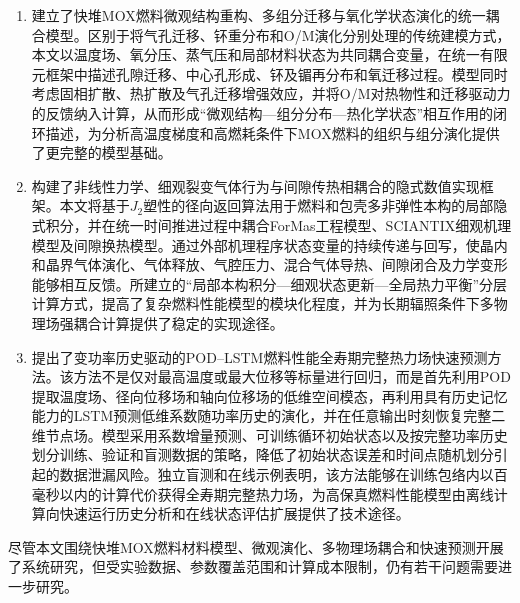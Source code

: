 \begin{enumerate}[label={（\arabic*）},leftmargin=2.8em]
	\item 建立了快堆MOX燃料微观结构重构、多组分迁移与氧化学状态演化的统一耦合模型。区别于将气孔迁移、钚重分布和O/M演化分别处理的传统建模方式，本文以温度场、氧分压、蒸气压和局部材料状态为共同耦合变量，在统一有限元框架中描述孔隙迁移、中心孔形成、钚及镅再分布和氧迁移过程。模型同时考虑固相扩散、热扩散及气孔迁移增强效应，并将O/M对热物性和迁移驱动力的反馈纳入计算，从而形成“微观结构—组分分布—热化学状态”相互作用的闭环描述，为分析高温度梯度和高燃耗条件下MOX燃料的组织与组分演化提供了更完整的模型基础。

	\item 构建了非线性力学、细观裂变气体行为与间隙传热相耦合的隐式数值实现框架。本文将基于$J_2$塑性的径向返回算法用于燃料和包壳多非弹性本构的局部隐式积分，并在统一时间推进过程中耦合ForMas工程模型、SCIANTIX细观机理模型及间隙换热模型。通过外部机理程序状态变量的持续传递与回写，使晶内和晶界气体演化、气体释放、气腔压力、混合气体导热、间隙闭合及力学变形能够相互反馈。所建立的“局部本构积分—细观状态更新—全局热力平衡”分层计算方式，提高了复杂燃料性能模型的模块化程度，并为长期辐照条件下多物理场强耦合计算提供了稳定的实现途径。

	\item 提出了变功率历史驱动的POD--LSTM燃料性能全寿期完整热力场快速预测方法。该方法不是仅对最高温度或最大位移等标量进行回归，而是首先利用POD提取温度场、径向位移场和轴向位移场的低维空间模态，再利用具有历史记忆能力的LSTM预测低维系数随功率历史的演化，并在任意输出时刻恢复完整二维节点场。模型采用系数增量预测、可训练循环初始状态以及按完整功率历史划分训练、验证和盲测数据的策略，降低了初始状态误差和时间点随机划分引起的数据泄漏风险。独立盲测和在线示例表明，该方法能够在训练包络内以百毫秒以内的计算代价获得全寿期完整热力场，为高保真燃料性能模型由离线计算向快速运行历史分析和在线状态评估扩展提供了技术途径。
\end{enumerate}


尽管本文围绕快堆MOX燃料材料模型、微观演化、多物理场耦合和快速预测开展了系统研究，但受实验数据、参数覆盖范围和计算成本限制，仍有若干问题需要进一步研究。

